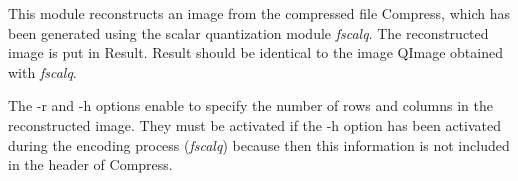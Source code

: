 This module reconstructs an image from the compressed file Compress, 
which has been generated using the scalar quantization module {\em fscalq}. 
The reconstructed image is put in Result. Result should be identical 
to the image QImage obtained with {\em fscalq}. 

The -r and -h options enable to specify the number of rows and columns 
in the reconstructed image. They must be activated if the -h option has 
been activated during the encoding process ({\em fscalq}) because then this 
information is not included in the header of Compress. 
